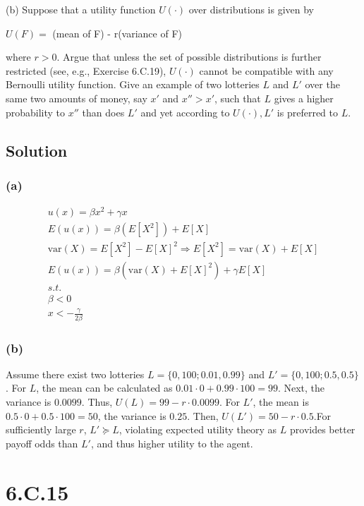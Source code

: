 \documentclass[10pt, a4paper]{article}
\newcommand{\var}{\text{var}}
\begin{document}
      (b) Suppose that a utility function $U(\cdot)$ over distributions is given by 
      \begin{center}
        $U(F) = $ (mean of F) - r(variance of F)
      \end{center}
      where $r>0$. Argue that unless the set of possible distributions is further restricted (see, e.g., Exercise 6.C.19), $U(\cdot)$ cannot be compatible with any Bernoulli utility function. Give an example of two lotteries $L$ and $L'$ over the same two amounts of money, say $x'$ and $x''>x'$, such that $L$ gives a higher probability to $x''$ than does $L'$ and yet according to $U(\cdot), L'$ is preferred to $L$. 
    \subsection*{Solution}
      \subsubsection*{(a)}
        \begin{gather*}
          u(x) = \beta x^2 + \gamma x\\
          E(u(x)) = \beta(E[X^2]) + E[X]\\
          \var(X) = E[X^2] - E[X]^2 \Rightarrow E[X^2] = \var(X) + E[X]\\
          E(u(x)) = \beta(\var(X)+E[X]^2) + \gamma E[X] \\
          s.t. \\
          \beta<0\\
          x < -\frac{\gamma}{2\beta} 
        \end{gather*}
      \subsubsection*{(b)}
        Assume there exist two lotteries $L = \{0, 100; 0.01, 0.99\}$ and $L' = \{0, 100; 0.5, 0.5\}$. For $L$, the mean can be calculated as $0.01\cdot0 + 0.99\cdot100 = 99$. Next, the variance is $0.0099$. Thus, $U(L) = 99 - r\cdot0.0099$. For $L'$, the mean is $0.5\cdot 0 + 0.5\cdot100 = 50$, the variance is $0.25$. Then, $U(L') = 50 - r\cdot0.5$.For sufficiently large $r$, $L'\succeq L$, violating expected utility theory as $L$ provides better payoff odds than $L'$, and thus higher utility to the agent. 
  \section*{6.C.15}
\end{document}
